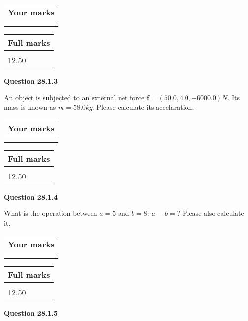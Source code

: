 \documentclass[12pt]{article}
\begin{document}
         \begin{tabular}{|l|}
\hline
 Your marks  \\
\hline
 \\ 
 \\ 
\hline
\end{tabular}
\hspace{0.05in} \begin{tabular}{|l|}
\hline
 Full marks  \\
\hline
 \\ 
12.50 \\
\hline
\end{tabular}
{\textbf{\Large{Question
28.1.3 
}}}
  
  
 
An object is subjected to an external net force $\mathbf{f}=(
50.0,  %
4.0,
-6000.0  )N$. Its mass is known as
$m= %
58.0 kg$. Please calculate its accelaration.
 
 

 

 
\vspace{0.3in}
  
\vspace{0.2in}
  
         \begin{tabular}{|l|}
\hline
 Your marks  \\
\hline
 \\ 
 \\ 
\hline
\end{tabular}
\hspace{0.05in} \begin{tabular}{|l|}
\hline
 Full marks  \\
\hline
 \\ 
12.50 \\
\hline
\end{tabular}
{\textbf{\Large{Question
28.1.4 
}}}
  
  
What is the operation between $a= %
5$ and $b= %
8$:
$a$  %
$-$ $b=?$ Please also calculate it.

 
\vspace{0.3in}
  
\vspace{0.2in}
  
         \begin{tabular}{|l|}
\hline
 Your marks  \\
\hline
 \\ 
 \\ 
\hline
\end{tabular}
\hspace{0.05in} \begin{tabular}{|l|}
\hline
 Full marks  \\
\hline
 \\ 
12.50 \\
\hline
\end{tabular}
{\textbf{\Large{Question
28.1.5 
}}}
  
\end{document}
